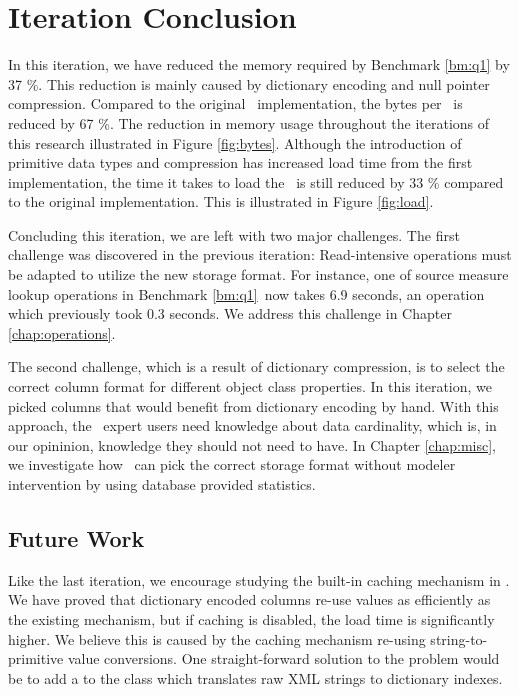 \section{Iteration Conclusion}
\label{sec:Iteration Conclusion}
In this iteration, we have reduced the memory required by Benchmark \ref{bm:q1} by 37 \%. This reduction is mainly caused by dictionary encoding and null pointer compression. Compared to the original \gap~implementation, the bytes per \lineitem~is reduced by 67 \%. The reduction in memory usage throughout the iterations of this research illustrated in Figure \ref{fig:bytes}. Although the introduction of primitive data types and compression has increased load time from the first  implementation, the time it takes to load the \tpchdl~is still reduced by 33 \% compared to the original implementation. This is illustrated in Figure \ref{fig:load}.

Concluding this iteration, we are left with two major challenges. The first challenge was discovered in the previous iteration: Read-intensive operations must be adapted to utilize the new storage format. For instance, one of source measure lookup operations in Benchmark \ref{bm:q1}~now takes 6.9 seconds, an operation which previously took 0.3 seconds. We address this challenge in Chapter \ref{chap:operations}.

The second challenge, which is a result of dictionary compression, is to select the correct column format for different object class properties. In this iteration, we picked columns that would benefit from dictionary encoding by hand. With this approach, the \gap~expert users need knowledge about data cardinality, which is, in our opininion, knowledge they should not need to have. In Chapter \ref{chap:misc}, we investigate how \gap~can pick the correct storage format without modeler intervention by using database provided statistics.

\subsection{Future Work}
\label{compression:future-work}
Like the last iteration, we encourage studying the built-in caching mechanism in \gap. We have proved that dictionary encoded columns re-use values as efficiently as the existing mechanism, but if caching is disabled, the load time is significantly higher. We believe this is caused by the caching mechanism re-using string-to-primitive value conversions. One straight-forward solution to the problem would be to add a  to the  class which translates raw XML strings to dictionary indexes.

